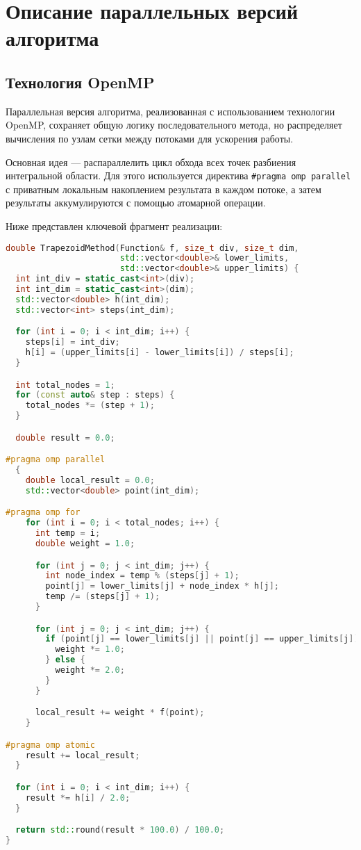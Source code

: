 \documentclass[a4paper,14pt]{article}
\begin{document}
\newpage
\section{Описание параллельных версий алгоритма}
\subsection{Технология OpenMP}

Параллельная версия алгоритма, реализованная с использованием технологии OpenMP, сохраняет общую логику последовательного метода, но распределяет вычисления по узлам сетки между потоками для ускорения работы.

Основная идея — распараллелить цикл обхода всех точек разбиения интегральной области. Для этого используется директива \texttt{\#pragma omp parallel} с приватным локальным накоплением результата в каждом потоке, а затем результаты аккумулируются с помощью атомарной операции.

Ниже представлен ключевой фрагмент реализации:

\begin{lstlisting}[language=C++]
double TrapezoidMethod(Function& f, size_t div, size_t dim,
                       std::vector<double>& lower_limits,
                       std::vector<double>& upper_limits) {
  int int_div = static_cast<int>(div);
  int int_dim = static_cast<int>(dim);
  std::vector<double> h(int_dim);
  std::vector<int> steps(int_dim);

  for (int i = 0; i < int_dim; i++) {
    steps[i] = int_div;
    h[i] = (upper_limits[i] - lower_limits[i]) / steps[i];
  }

  int total_nodes = 1;
  for (const auto& step : steps) {
    total_nodes *= (step + 1);
  }

  double result = 0.0;

#pragma omp parallel
  {
    double local_result = 0.0;
    std::vector<double> point(int_dim);

#pragma omp for
    for (int i = 0; i < total_nodes; i++) {
      int temp = i;
      double weight = 1.0;

      for (int j = 0; j < int_dim; j++) {
        int node_index = temp % (steps[j] + 1);
        point[j] = lower_limits[j] + node_index * h[j];
        temp /= (steps[j] + 1);
      }

      for (int j = 0; j < int_dim; j++) {
        if (point[j] == lower_limits[j] || point[j] == upper_limits[j]) {
          weight *= 1.0;
        } else {
          weight *= 2.0;
        }
      }

      local_result += weight * f(point);
    }

#pragma omp atomic
    result += local_result;
  }

  for (int i = 0; i < int_dim; i++) {
    result *= h[i] / 2.0;
  }

  return std::round(result * 100.0) / 100.0;
}
\end{lstlisting}
\end{document}
